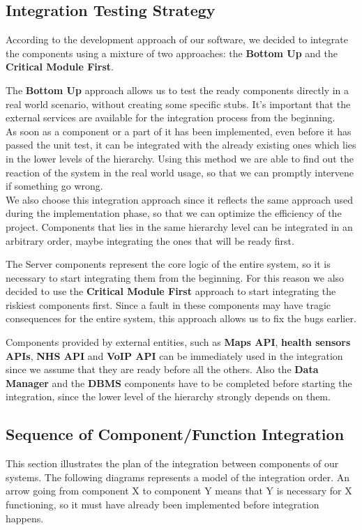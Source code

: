 \clearpage
\subsection{Integration Testing Strategy}
According to the development approach of our software, we decided to integrate the components using a mixture of two approaches: the \textbf{Bottom Up} and the \textbf{Critical Module First}.

The \textbf{Bottom Up} approach allows us to test the ready components directly in a real world scenario, without creating some specific stubs. It's important that the external services are available for the integration process from the beginning.\\
As soon as a component or a part of it has been implemented, even before it has passed the unit test, it can be integrated with the already existing ones which lies in the lower levels of the hierarchy. Using this method we are able to find out the reaction of the system in the real world usage, so that we can promptly intervene if something go wrong.\\
We also choose this integration approach since it reflects the same approach used during the implementation phase, so that we can optimize the efficiency of the project.
Components that lies in the same hierarchy level can be integrated in an arbitrary order, maybe integrating the ones that will be ready first.

The Server components represent the core logic of the entire system, so it is necessary to start integrating them from the beginning.
For this reason we also decided to use the \textbf{Critical Module First} approach to start integrating the riskiest components first.
Since a fault in these components may have tragic consequences for the entire system, this approach allows us to fix the bugs earlier.

Components provided by external entities, such as \textbf{Maps API}, \textbf{health sensors APIs}, \textbf{NHS API} and \textbf{VoIP API} can be immediately used in the integration since we assume that they are ready before all the others. Also the \textbf{Data Manager} and the \textbf{DBMS} components have to be completed before starting the integration, since the lower level of the hierarchy strongly depends on them.\\
\subsection{Sequence of Component/Function Integration}
This section illustrates the plan of the integration between components of our systems. The following diagrams represents a model of the integration order. An arrow going from component X to component Y means that Y is necessary for X functioning, so it must have already been implemented before integration happens.


